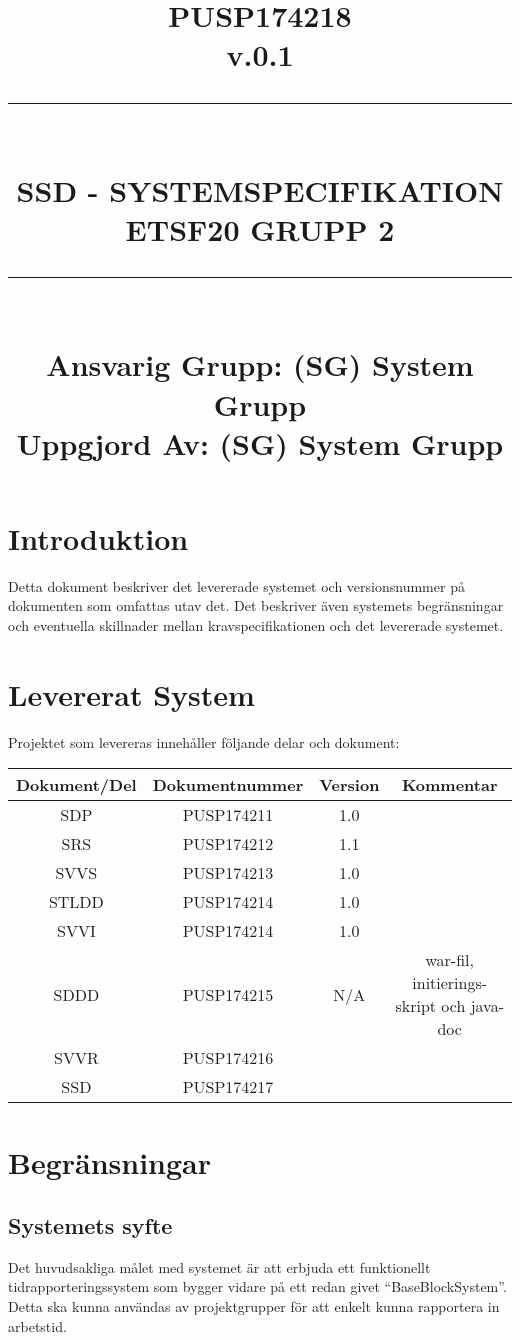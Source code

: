 \documentclass[paper=a4, fontsize=11pt,twoside]{article}
\title{
		\documentNumber{#1}																						
		\documentVersion{#2}																				
		\HRule{0.5pt} \\ %
		\LARGE \textbf{\uppercase{#3}} \\
		\large \textbf{\uppercase{ETSF20 Grupp 2}} 
		\HRule{2pt} \\ [1.5cm]    
		\normalsize            
		\documentResponsible{#4} \\ 
		\documentCreator{#4}  
	}
\newcommand{\HRule}[1]{\rule{\linewidth}{#1}}
\newcommand{\documentNumber}[1]{\centering PUSP1742#1 \\[1.0cm]}
\newcommand{\documentVersion}[1]{\centering \small{v.#1} \\[1.0cm]}
\newcommand{\documentResponsible}[1]{\centering  Ansvarig Grupp: #1}
\newcommand{\documentCreator}[1]{\centering Uppgjord Av: #1}
\newcommand{\grouptitlepage}[4]{ 
	\title{
		\documentNumber{#1}																						
		\documentVersion{#2}																				
		\HRule{0.5pt} \\ %
		\LARGE \textbf{\uppercase{#3}} \\
		\large \textbf{\uppercase{ETSF20 Grupp 2}} 
		\HRule{2pt} \\ [1.5cm]    
		\normalsize            
		\documentResponsible{#4} \\ 
		\documentCreator{#4}  
	}																							
	\maketitle																							
	\thispagestyle{empty} 																					
	\newpage 
}
\begin{document}
\grouptitlepage
{18}
{0.1}
{SSD - Systemspecifikation}
{(SG) System Grupp}
\tableofcontents
\newpage
\section{Introduktion}
Detta dokument beskriver det levererade systemet och versionsnummer på dokumenten som omfattas utav det. Det beskriver även systemets begränsningar och eventuella skillnader mellan kravspecifikationen och det levererade systemet.

\section{Levererat System}
Projektet som levereras innehåller följande delar och dokument:
\begin{center}
\begin{tabular}{|c|c|c|c|}
	\hline	
	Dokument/Del & Dokumentnummer & Version & Kommentar \\
	\hline	
	SDP & PUSP174211 & 1.0 & \\
	\hline
	SRS & PUSP174212 & 1.1 & \\
	\hline
	SVVS & PUSP174213 & 1.0 & \\
	\hline
	STLDD & PUSP174214 & 1.0 & \\
	\hline
	SVVI & PUSP174214 & 1.0 & \\
	\hline
	SDDD & PUSP174215 & N/A & war-fil, initierings-skript och java-doc\\
	\hline
	SVVR & PUSP174216 &  & \\
	\hline
	SSD & PUSP174217 & & \\
	\hline
\end{tabular}
\end{center}
\section{Begränsningar}
\subsection{Systemets syfte}
Det huvudsakliga målet med systemet är att erbjuda ett funktionellt tidrapporteringssystem som bygger vidare på ett redan givet “BaseBlockSystem”. Detta ska kunna användas av projektgrupper för att enkelt kunna rapportera in arbetstid.
\end{document}
